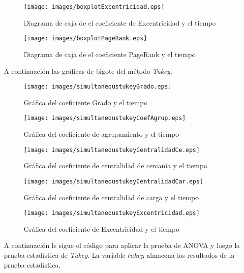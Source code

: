 \documentclass{article}
\begin{document}
\begin{figure}[H] 
    \centering
        \texttt{[image: images/boxplotExcentricidad.eps]}
\caption{Diagrama de caja de el coeficiente de Excentricidad y el tiempo}
\label{fig:seq1}
\end{figure}

\begin{figure}[H] 
    \centering
        \texttt{[image: images/boxplotPageRank.eps]}
\caption{Diagrama de caja de el coeficiente PageRank y el tiempo}
\label{fig:seq1}
\end{figure}


A continuación las gráficas de bigote del método \textit{Tukey}.

\begin{figure}[H] 
    \centering
        \texttt{[image: images/simultaneoustukeyGrado.eps]}
\caption{Gráfica del coeficiente Grado y el tiempo}
\label{fig:seq1}
\end{figure} 

\begin{figure}[H] 
    \centering
        \texttt{[image: images/simultaneoustukeyCoefAgrup.eps]}
\caption{Gráfica del coeficiente de agrupamiento y el tiempo}
\label{fig:seq1}
\end{figure} 

\begin{figure}[H] 
    \centering
        \texttt{[image: images/simultaneoustukeyCentralidadCe.eps]}
\caption{Gráfica del coeficiente de centralidad de cercanía y el tiempo}
\label{fig:seq1}
\end{figure} 

\begin{figure}[H] 
    \centering
        \texttt{[image: images/simultaneoustukeyCentralidadCar.eps]}
\caption{Gráfica del coeficiente de centralidad de carga y el tiempo}
\label{fig:seq1}
\end{figure} 

\begin{figure}[H] 
    \centering
        \texttt{[image: images/simultaneoustukeyExcentricidad.eps]}
\caption{Gráfica del coeficiente de Excentricidad y el tiempo}
\label{fig:seq1}
\end{figure} 

A continuación le sigue el código para aplicar la prueba de ANOVA y luego la prueba estadística de \textit{Tukey}. La variable $tukey$ almacena los resultados de la prueba estadística. 
\end{document}
